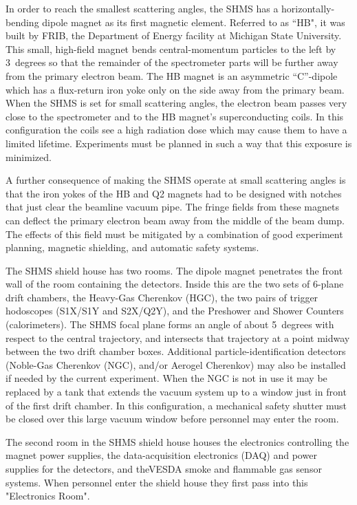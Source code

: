 In order to reach the smallest scattering angles, the SHMS has a horizontally-bending dipole
magnet as its first magnetic element. Referred to as ``HB", it was built by FRIB, the Department of Energy
facility at Michigan State  University. This small, high-field magnet bends
central-momentum particles to the left by 3~degrees so that the remainder of the
spectrometer parts will be further away from the primary electron beam. The HB
magnet is an asymmetric ``C''-dipole which has a flux-return iron yoke only on
the side away from the primary beam. When the SHMS is set for small scattering
angles, the electron beam passes very close to the spectrometer and to the
HB magnet's superconducting
coils. In this configuration the coils see a high radiation dose which may cause
them to have a limited
lifetime. Experiments must be planned in such a way that this exposure is minimized.

A further consequence of making the SHMS operate at small scattering angles is
that the iron yokes of the HB and Q2 magnets had to be designed with notches
that just clear the beamline vacuum pipe. The fringe fields from these magnets can
deflect the primary electron beam away from the middle of the beam dump.
The effects of this field
must be mitigated by a combination of good experiment planning, magnetic shielding,
and automatic safety systems.

The SHMS shield house has two rooms. The dipole magnet penetrates the front
wall of the room containing the detectors. Inside this are the two sets of 6-plane
drift chambers, the Heavy-Gas Cherenkov (HGC), the two pairs of trigger hodoscopes
(S1X/S1Y and S2X/Q2Y), and
the Preshower and Shower Counters (calorimeters). The SHMS focal plane forms an
angle of about 5~degrees with respect to the central trajectory,
and intersects that trajectory at
a point midway between the two drift chamber boxes. Additional  particle-identification
detectors (Noble-Gas Cherenkov (NGC), and/or Aerogel Cherenkov) may also be
installed if needed by the current experiment. When the NGC is not in use it may
be replaced by a tank that extends the vacuum system up  to a window just in
front of the first drift chamber. In this configuration, a mechanical safety shutter
must be closed over this large vacuum window before personnel may enter the
room.

The second room in the SHMS shield house houses the
electronics controlling the magnet power supplies, the data-acquisition
electronics (DAQ) and power supplies for the detectors, and theVESDA
smoke and flammable gas sensor systems. When personnel enter the shield
house they first pass into this "Electronics Room".

